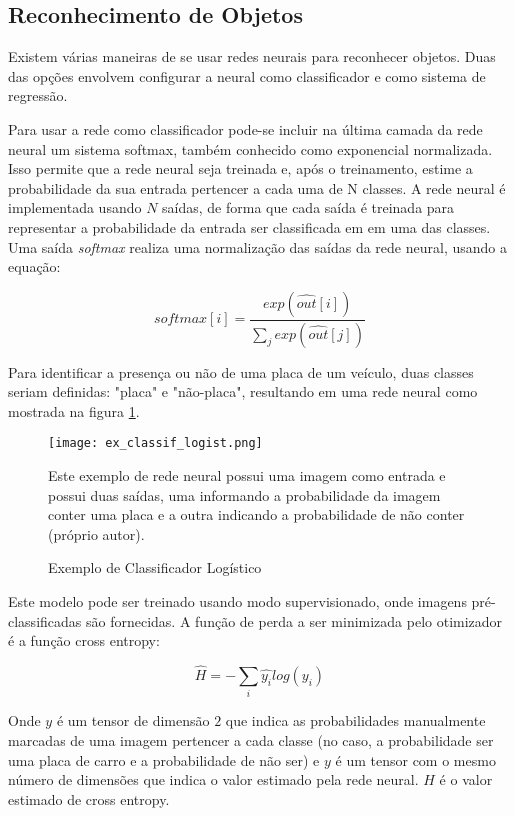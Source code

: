 \subsection{Reconhecimento de Objetos}
Existem várias maneiras de se usar redes neurais para reconhecer objetos. Duas
das opções envolvem configurar a neural como classificador e como sistema de
regressão.

Para usar a rede como classificador pode-se incluir na última camada da rede
neural um sistema softmax, também conhecido como exponencial normalizada. Isso
permite que a rede neural seja treinada e, após o treinamento, estime a
probabilidade da sua entrada pertencer a cada uma de N classes. A rede neural é
implementada usando $N$ saídas, de forma que cada saída é treinada para
representar a probabilidade da entrada ser classificada em em uma das classes.
Uma saída \emph{softmax} realiza uma normalização das saídas da rede neural,
usando a equação:

\begin{equation}
	softmax[i] = \frac
		{exp\left( \widehat{out}[i] \right)}
		{\sum_j exp\left( \widehat{out}[j] \right)}
\end{equation}

Para identificar a presença ou não de uma placa de um veículo, duas classes
seriam definidas: "placa" e "não-placa", resultando em uma rede neural como
mostrada na figura \ref{fig:ex_classif_logist}.

\begin{figure}[!htb]
	\centering
	\texttt{[image: ex\_classif\_logist.png]}
	\caption{Exemplo de Classificador Logístico}
	\label{fig:ex_classif_logist}
	Este exemplo de rede neural possui uma imagem como entrada e possui duas
	saídas, uma informando a probabilidade da imagem conter uma placa e a
	outra indicando a probabilidade de não conter (próprio autor).
\end{figure}

Este modelo pode ser treinado usando modo supervisionado, onde imagens
pré-classificadas são fornecidas. A função de perda a ser minimizada pelo
otimizador é a função cross entropy:

\begin{equation}
	\widehat{H} = - \sum_i \widehat{y_i} log(y_i)
\end{equation}

Onde $y$ é um tensor de dimensão $2$ que indica as probabilidades manualmente
marcadas de uma imagem pertencer a cada classe (no caso, a probabilidade ser uma
placa de carro e a probabilidade de não ser) e $y$ é um tensor com o mesmo número
de dimensões que indica o valor estimado pela rede neural. $H$ é o valor estimado
de cross entropy.

